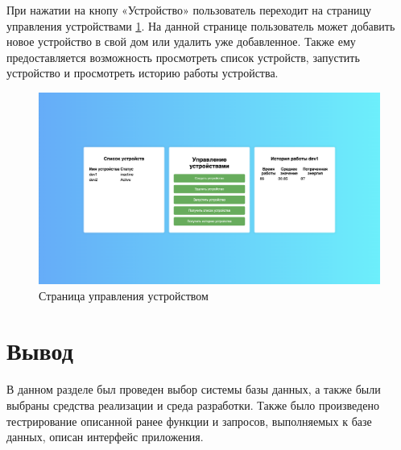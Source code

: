 При нажатии на кнопу «Устройство» пользователь переходит на страницу управления устройствами \ref{img:dev}. На данной странице 
пользователь может добавить новое устройство в свой дом или удалить уже добавленное. Также ему предоставляется возможность
просмотреть список устройств, запустить устройство и просмотреть историю работы устройства.

\begin{figure}[H]
    \includegraphics[width=1\linewidth]{img/device.png}
    \caption{\label{img:dev} Страница управления устройством}
\end{figure}
\noindent

\section*{Вывод}

В данном разделе был проведен выбор системы базы данных, а также
были выбраны средства реализации и среда разработки. Также было произведено тестрирование 
описанной ранее функции и запросов, выполняемых к базе данных, описан интерфейс приложения.
